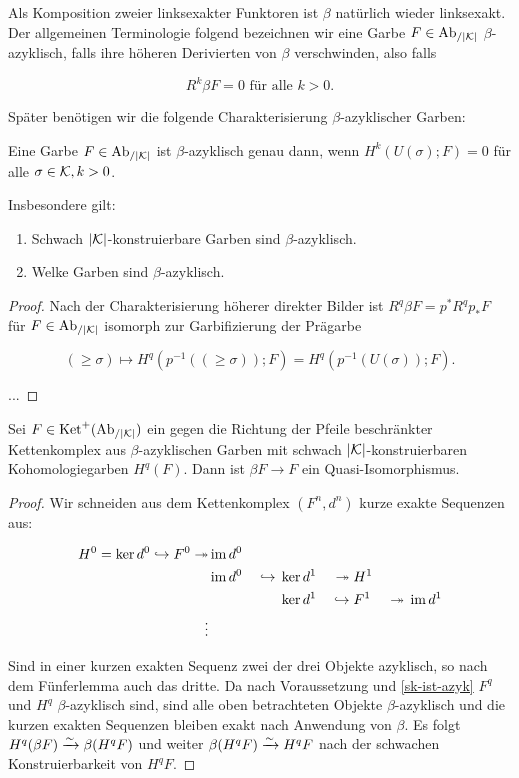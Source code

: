 
Als Komposition zweier linksexakter Funktoren ist $\beta$ natürlich
wieder linksexakt. Der allgemeinen Terminologie folgend bezeichnen wir
eine Garbe $F \in \operatorname{Ab}_{/|\mathcal{K}|}$ $\beta$-azyklisch, falls ihre höheren
Derivierten von $\beta$ verschwinden, also falls

\[ R^k\beta F = 0 \text{ für alle } k > 0.  \]

Später benötigen wir die folgende Charakterisierung
$\beta$-azyklischer Garben:

\begin{prop} \label{sk-ist-azyk}
  Eine Garbe $F \in \operatorname{Ab}_{/|\mathcal{K}|}$ ist $\beta$-azyklisch genau dann, wenn
  $H^k(U(\sigma); F) = 0$ für alle $\sigma \in \mathcal{K}, k >
  0$.

  Insbesondere gilt:
  \begin{enumerate}
  \item Schwach $|\mathcal{K}|$-konstruierbare Garben sind $\beta$-azyklisch.
  \item Welke Garben sind $\beta$-azyklisch.
  \end{enumerate}  
\end{prop}
\begin{proof}
  Nach der Charakterisierung höherer direkter Bilder ist $R^q \beta F
  = p^* R^q p_* F$ für $F \in \operatorname{Ab}_{/|\mathcal{K}|}$ isomorph zur Garbifizierung der
  Prägarbe

  \[ (\geq \sigma) \mapsto H^q(p^{-1}((\geq \sigma)); F) = H^q(p^{-1}(U(\sigma)); F). \]

  ...
\end{proof}


\begin{prop}
  Sei $F \in \operatorname{Ket}^+(\operatorname{Ab}_{/|\mathcal{K}|})$ ein gegen die Richtung der Pfeile
  beschränkter Kettenkomplex aus $\beta$-azy\-klischen Garben mit
  schwach $|\mathcal{K}|$-kon\-stru\-ier\-bar\-en Kohomologiegarben $H^q(F)$. Dann
  ist $\beta F \to F$ ein Quasi-Iso\-mor\-phis\-mus.
\end{prop}
\begin{proof}
  Wir schneiden aus dem Kettenkomplex $(F^n, d^n)$ kurze exakte
  Sequenzen aus:
  
  \begin{alignat*}{4}
    H^0 = \ker d^0 \hookrightarrow F^0 \twoheadrightarrow &\operatorname{im} d^0 & & \\
    &\operatorname{im} d^0& {} \hookrightarrow {} &\ker d^1& {}\twoheadrightarrow {} &H^1& \\
    && &\ker d^1& {} \hookrightarrow {} &F^1& {} \twoheadrightarrow {} \operatorname{im} d^1 \\
    \vdots
  \end{alignat*}
  
  Sind in einer kurzen exakten Sequenz zwei der drei Objekte
  azyklisch, so nach dem Fünferlemma auch das dritte. Da nach
  Voraussetzung und \ref{sk-ist-azyk} $F^q$ und $H^q$
  $\beta$-azyklisch sind, sind alle oben betrachteten Objekte
  $\beta$-azyklisch und die kurzen exakten Sequenzen bleiben exakt
  nach Anwendung von $\beta$. Es folgt $H^q(\beta F) \xrightarrow{\sim} \beta (H^q
  F)$ und weiter $\beta (H^q F) \xrightarrow{\sim} H^q F$ nach der schwachen
  Konstruierbarkeit von $H^q F$.
\end{proof}


